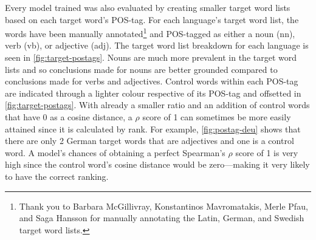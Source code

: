 Every model trained was also evaluated by creating smaller target word lists based on each target word’s POS-tag. For each language’s target word list, the words have been manually annotated\footnote{Thank you to Barbara McGillivray, Konstantinos Mavromatakis, Merle Pfau, and Saga Hansson for manually annotating the Latin, German, and Swedish target word lists.} and POS-tagged as either a noun (nn), verb (vb), or adjective (adj). The target word list breakdown for each language is seen in \autoref{fig:target-postags}. Nouns are much more prevalent in the target word lists and so conclusions made for nouns are better grounded compared to conclusions made for verbs and adjectives. Control words within each POS-tag are indicated through a lighter colour respective of its POS-tag and offsetted in \autoref{fig:target-postags}. With already a smaller ratio and an addition of control words that have 0 as a cosine distance, a $\rho$ score of 1 can sometimes be more easily attained since it is calculated by rank. For example, \autoref{fig:postag-deu} shows that there are only 2 German target words that are adjectives and one is a control word. A model’s chances of obtaining a perfect Spearman's $\rho$ score of 1 is very high since the control word's cosine distance would be zero—making it very likely to have the correct ranking. 


